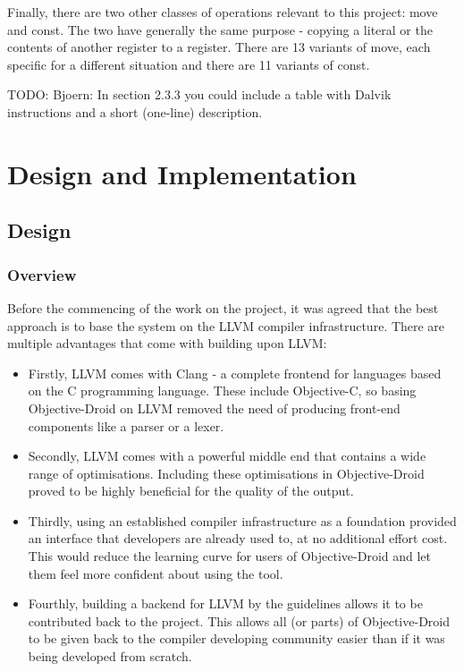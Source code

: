\documentclass[parskip]{cs4rep}
\begin{document}
Finally, there are two other classes of operations relevant to this project: move and const. The two have generally the same purpose - copying a literal or the contents of another register to a register. There are 13 variants of move, each specific for a different situation and there are 11 variants of const.

TODO: Bjoern: In section 2.3.3 you could include a table with Dalvik instructions and a short (one-line) description.

\chapter{Design and Implementation}

\section{Design}

\subsection{Overview}

Before the commencing of the work on the project, it was agreed that the best approach is to base the system on the LLVM compiler infrastructure. There are multiple advantages that come with building upon LLVM:
\begin{itemize}
\item
Firstly, LLVM comes with Clang - a complete frontend for languages based on the C programming language. These include Objective-C, so basing Objective-Droid on LLVM removed the need of producing front-end components like a parser or a lexer.
\item
Secondly, LLVM comes with a powerful middle end that contains a wide range of optimisations\cite{P7}. Including these optimisations in Objective-Droid proved to be highly beneficial for the quality of the output. 
\item
Thirdly, using an established compiler infrastructure as a foundation provided an interface that developers are already used to, at no additional effort cost. This would reduce the learning curve for users of Objective-Droid and let them feel more confident about using the tool.
\item
Fourthly, building a backend for LLVM by the guidelines allows it to be contributed back to the project. This allows all (or parts) of Objective-Droid to be given back to the compiler developing community easier than if it was being developed from scratch.
\end{itemize}
\end{document}
